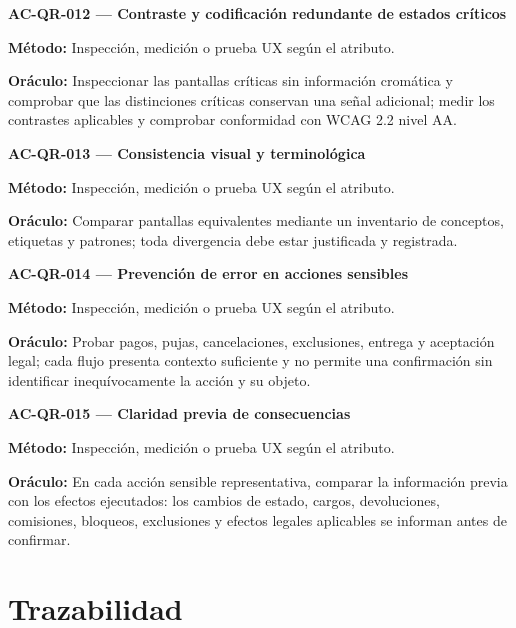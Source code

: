 \documentclass[10pt,letterpaper]{article}
\begin{document}
\noindent\textbf{AC-QR-012 --- Contraste y codificación redundante de estados críticos}\par
\textbf{Método:} Inspección, medición o prueba UX según el atributo.\par
\textbf{Oráculo:} Inspeccionar las pantallas críticas sin información cromática y comprobar que las distinciones críticas conservan una señal adicional; medir los contrastes aplicables y comprobar conformidad con WCAG 2.2 nivel AA.\par\vspace{0.45em}
\noindent\textbf{AC-QR-013 --- Consistencia visual y terminológica}\par
\textbf{Método:} Inspección, medición o prueba UX según el atributo.\par
\textbf{Oráculo:} Comparar pantallas equivalentes mediante un inventario de conceptos, etiquetas y patrones; toda divergencia debe estar justificada y registrada.\par\vspace{0.45em}
\noindent\textbf{AC-QR-014 --- Prevención de error en acciones sensibles}\par
\textbf{Método:} Inspección, medición o prueba UX según el atributo.\par
\textbf{Oráculo:} Probar pagos, pujas, cancelaciones, exclusiones, entrega y aceptación legal; cada flujo presenta contexto suficiente y no permite una confirmación sin identificar inequívocamente la acción y su objeto.\par\vspace{0.45em}
\noindent\textbf{AC-QR-015 --- Claridad previa de consecuencias}\par
\textbf{Método:} Inspección, medición o prueba UX según el atributo.\par
\textbf{Oráculo:} En cada acción sensible representativa, comparar la información previa con los efectos ejecutados: los cambios de estado, cargos, devoluciones, comisiones, bloqueos, exclusiones y efectos legales aplicables se informan antes de confirmar.\par\vspace{0.45em}
\section{Trazabilidad}
\end{document}
